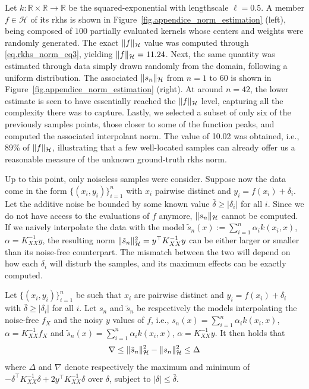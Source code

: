 Let $k:\mathbb{R}\times \mathbb{R} \rightarrow \mathbb{R}$ be the squared-exponential with lengthscale $\ell = 0.5$. A member $f \in \mathcal{H}$ of its \ac{rkhs} is shown in Figure~\ref{fig.appendice_norm_estimation} (left), being composed of $100$ partially evaluated kernels whose centers and weights were randomly generated. The exact $\Vert f\Vert_{\mathcal{H}}$ value was computed through \eqref{eq.rkhs_norm_eq3}, yielding $\Vert f\Vert_{\mathcal{H}} = 11.24$. Next, the same quantity was estimated through data simply drawn randomly from the domain, following a uniform distribution. The associated $\Vert s_n \Vert_{\mathcal{H}}$ from $n=1$ to $60$ is shown in Figure~\ref{fig.appendice_norm_estimation} (right). At around $n=42$, the lower estimate is seen to have essentially reached the $\Vert f \Vert_{\mathcal{H}}$ level, capturing all the complexity there was to capture. Lastly, we selected a subset of only six of the previously samples points, those closer to some of the function peaks, and computed the associated interpolant norm. The value of 10.02 was obtained, i.e., 89\% of $\Vert f \Vert_{\mathcal{H}}$, illustrating that a few well-located samples can already offer us a reasonable measure of the unknown ground-truth \ac{rkhs} norm.

Up to this point, only noiseless samples were consider. Suppose now the data come in the form $\{(x_i,y_i)\}_{i=1}^n$ with $x_i$ pairwise distinct and $y_i=f(x_i) + \delta_i$. Let the additive noise be bounded by some known value $\bar \delta \geq |\delta_i|$ for all $i$. Since we do not have access to the evaluations of $f$ anymore, $\Vert s_n \Vert_{\mathcal{H}}$ cannot be computed. If we naively interpolate the data with the model $\tilde s_n(x) := \sum_{i=1}^n \alpha_i k(x_i,x)$, $\alpha = K_{XX}^{-1} y$, the resulting norm $\Vert \tilde s_n \Vert_{\mathcal{H}}^2 = y^\top K_{XX}^{-1}y$ can be either larger or smaller than its noise-free counterpart. The mismatch between the two will depend on how each $\delta_i$ will disturb the samples, and its maximum effects can be exactly computed.

\begin{proposition}
	Let $\{(x_i,y_i)\}_{i=1}^n$ be such that $x_i$ are pairwise distinct and $y_i = f(x_i) + \delta_i$ with $\bar \delta \geq |\delta_i|$ for all $i$. Let $s_n$ and $\tilde s_n$ be respectively the models interpolating the noise-free $f_X$ and the noisy $y$ values of $f$, i.e., $s_n(x) = \sum_{i=1}^n \alpha_i k(x_i,x)$, $\alpha = K_{XX}^{-1} f_X$ and $\tilde s_n(x) = \sum_{i=1}^n \alpha_i k(x_i,x)$, $\alpha = K_{XX}^{-1} y$. It then holds that
	\begin{equation}
		\nabla \leq \Vert \tilde s_n \Vert_{\mathcal{H}}^2 - \Vert s_n \Vert_{\mathcal{H}}^2 \leq \Delta
	\end{equation}
	where $\Delta$ and $\nabla$ denote respectively the maximum and minimum of $-\delta^\top K_{XX}^{-1} \delta + 2y^\top K_{XX}^{-1} \delta$ over $\delta$, subject to $|\delta| \leq \bar \delta$.
	\label{prop.norms_mismatch}
\end{proposition}

